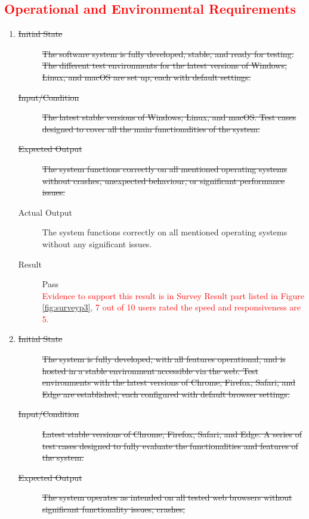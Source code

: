 \documentclass[12pt, titlepage]{article}
\newcommand{\rt}[1]{\textcolor{red}{#1}}
\begin{document}
\rt{\subsection{Operational and Environmental Requirements}}
\begin{enumerate}
\item \label{NFRT16}
  \begin{description}
  \item[\sout{Initial State}] \sout{The software system is fully developed,
      stable, and ready for testing. The different test environments for the
      latest versions of Windows, Linux, and macOS are set up, each with
      default settings.}
  \item[\sout{Input/Condition}] \sout{The latest stable versions of Windows,
      Linux, and macOS. Test cases designed to cover all the main
      functionalities of the system.}
  \item[\sout{Expected Output}] \sout{The system functions correctly on all
      mentioned operating systems without crashes, unexpected behaviour, or
      significant performance issues.}
  \item[Actual Output] The system functions correctly on all mentioned operating
    systems without any significant issues.
  \item[Result] Pass \\
    \rt{Evidence to support this result is in Survey Result part listed in Figure
      \ref{fig:surveyp3}, 7 out of 10 users rated the speed and
      responsiveness are 5.}
  \end{description}
\item \label{NFRT17}
  \begin{description}
  \item[\sout{Initial State}] \sout{The system is fully developed, with all
      features operational, and is hosted in a stable environment accessible
      via the web. Test environments with the latest versions of Chrome,
      Firefox, Safari, and Edge are established, each configured with
      default browser settings.}
  \item[\sout{Input/Condition}] \sout{Latest stable versions of Chrome,
      Firefox, Safari, and Edge. A series of test cases designed to fully
      evaluate the functionalities and features of the system.}
  \item[\sout{Expected Output}] \sout{The system operates as intended on all
      tested web browsers without significant functionality issues, crashes,
}
\end{description}
\end{enumerate}
\end{document}
